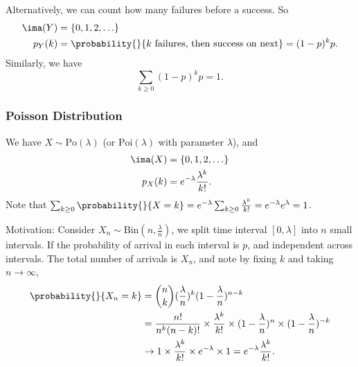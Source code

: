 Alternatively, we can count how many failures before a success. So
\begin{align*}
    \ima(Y) &= \{0,1,2, \ldots\}\\
    p_Y(k) &= \probability{}{k \text{ failures, then success on next}} = (1-p)^k p.
\end{align*}
Similarly, we have
\[
    \sum\limits_{k\geq 0}(1-p)^{k}p = 1.
\]
\subsubsection{Poisson Distribution}
We have \(X \sim \mathrm{Po}(\lambda)\) (or \(\mathrm{Poi}(\lambda)\) with parameter \(\lambda\)), and
\begin{align*}
    \ima(X) &= \{0,1,2, \ldots\}\\
    p_X(k) &= e^{-\lambda}\frac{\lambda^k}{k!}.
\end{align*}
Note that \(\sum_{k\geq 0} \probability{}{X = k} = e^{-\lambda} \sum_{k\geq 0}\frac{\lambda^k}{k!}=e^{-\lambda}e^{\lambda} = 1\).

Motivation: Consider \(X_n \sim \mathrm{Bin}(n, \frac{\lambda}{n})\), we split time interval \([0, \lambda]\) into \(n\) small intervals. If the probability of arrival in each interval is \(p\), and independent across intervals. The total number of arrivals is \(X_n\), and note by fixing \(k\) and taking \(n \to \infty\),
\begin{align*}
    \probability{}{X_n = k} &= \binom{n}{k}(\frac{\lambda}{n})^k(1-\frac{\lambda}{n})^{n-k}\\
    &= \frac{n!}{n^k(n-k)!} \times \frac{\lambda^k}{k!}\times (1-\frac{\lambda}{n})^n \times (1-\frac{\lambda}{n})^{-k}\\
    &\to 1 \times \frac{\lambda^k}{k!} \times e^{-\lambda} \times 1 = e^{-\lambda}\frac{\lambda^k}{k!}.
\end{align*}
